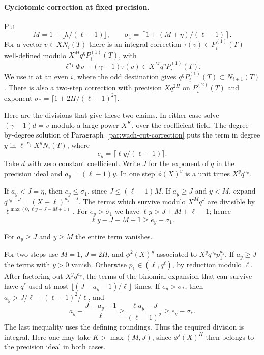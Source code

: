 \paragraph{Cyclotomic correction at fixed precision.}
\label{par:thick-integral-correction}
Put
\[
 M=1+\lfloor h/(\ell-1)\rfloor,\qquad
 \sigma_1=\left\lceil 1+(M+\eta)/(\ell-1)\right\rceil .
\]
For a vector \(v\in XN_i(T)\) there is an integral correction
\(\tau(v)\in P_i^{(1)}(T)\) well-defined modulo
\(X^Mq^\eta P_i^{(1)}(T)\), with
\[
  \ell^{\sigma_1}\Phi v-(\gamma-1)\tau(v)
             \in X^Mq^\eta P_i^{(1)}(T).
\]
We use it at an even \(i\), where the odd destination gives
\(q^\eta P_i^{(1)}(T)\subset N_{i+1}(T)\).
There is also a two-step correction with precision \(Xq^{2H}\)
on \(P_i^{(2)}(T)\) and exponent
\(\sigma_*=\lceil1+2H/(\ell-1)^2\rceil\).

Here are the divisions that give these two claims. In either
case solve \((\gamma-1)d=v\) modulo a large power \(X^K\),
over the coefficient field. The degree-by-degree solution
of Paragraph~\ref{par:wach-cut-correction} puts the term in
degree \(y\) in \(\ell^{-e_y}X^yN_i(T)\), where
\[
 e_y=\lceil\ell y/(\ell-1)\rceil.
\]
Take \(d\) with zero
constant coefficient. Write \(J\) for the exponent of \(q\)
in the precision ideal and \(a_y=(\ell-1)y\). In one step
\(\phi(X)^y\) is a unit times \(X^yq^{a_y}\).

If \(a_y<J=\eta\), then \(e_y\le\sigma_1\), since
\(J\le (\ell-1)M\). If \(a_y\ge J\) and \(y<M\),
expand \(q^{a_y-J}=(X+\ell)^{a_y-J}\).
The terms which survive modulo \(X^Mq^J\) are divisible by
\(\ell^{\max(0,\ell y-J-M+1)}\). For \(e_y>\sigma_1\)
we have \(\ell y>J+M+\ell-1\); hence
\[
 \ell y-J-M+1\ge e_y-\sigma_1.
\]

For \(a_y\ge J\) and \(y\ge M\) the entire term vanishes.

For two steps use \(M=1\), \(J=2H\), and
\(\phi^2(X)^y\) associated to
\(X^yq^{a_y}p_1^{a_y}\).
If \(a_y\ge J\) the terms with \(y>0\) vanish. Otherwise
\(p_1\in(\ell,q^\ell)\), by reduction modulo \(\ell\).
After factoring out \(X^yq^{a_y}\), the terms of the binomial
expansion that can survive have \(q^\ell\) used at most
\(\lfloor(J-a_y-1)/\ell\rfloor\) times. If
\(e_y>\sigma_*\), then
\(a_y>J/\ell+(\ell-1)^2/\ell\), and
\[
 a_y-\frac{J-a_y-1}{\ell}
      \ge \frac{\ell a_y-J}{(\ell-1)^2}
      \ge e_y-\sigma_* .
\]
The last inequality uses the defining roundings. Thus the
required division is integral. Here one may take \(K>\max(M,J)\), since
\(\phi^j(X)^K\) then belongs to the precision ideal in both
cases.

